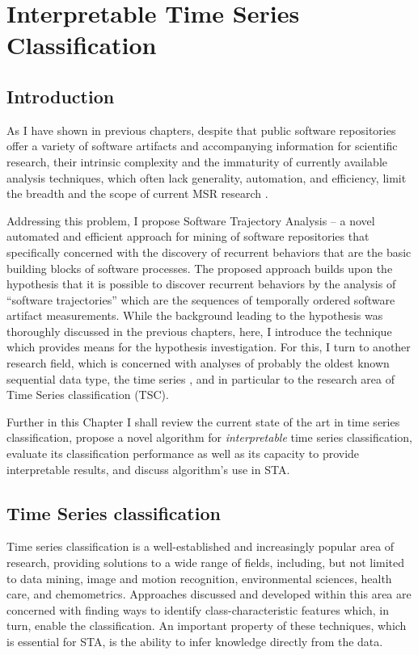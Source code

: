 \chapter{Interpretable Time Series Classification}\label{chapter_sax_vsm}

\section{Introduction}
As I have shown in previous chapters, despite that public software repositories offer a variety of software artifacts 
and accompanying information for scientific research, their intrinsic complexity and the immaturity of 
currently available analysis techniques, which often lack generality, automation, and efficiency, limit the breadth 
and the scope of current MSR research \cite{citeulike:7853299} \cite{citeulike:12550438}.

Addressing this problem, I propose Software Trajectory Analysis -- a novel automated and efficient approach for mining 
of software repositories that specifically concerned with the discovery of recurrent behaviors that are the basic building 
blocks of software processes. 
The proposed approach builds upon the hypothesis that it is possible to discover recurrent behaviors by the analysis 
of ``software trajectories'' which are the sequences of temporally ordered software artifact measurements. 
While the background leading to the hypothesis was thoroughly discussed in the previous chapters, here, 
I introduce the technique which provides means for the hypothesis investigation. 
For this, I turn to another research field, which is concerned with analyses of probably the oldest known sequential 
data type, the time series \cite{citeulike:1454223}, and in particular to the research area of 
Time Series classification (TSC).

Further in this Chapter I shall review the current state of the art in time series classification, propose a novel
algorithm for \textit{interpretable} time series classification, evaluate its classification performance as well as its  
capacity to provide interpretable results, and discuss algorithm's use in STA.

\section{Time Series classification}
Time series classification is a well-established and increasingly popular area of research, providing solutions to a wide 
range of fields, including, but not limited to data mining, image and motion recognition, environmental sciences, health care, 
and chemometrics. Approaches discussed and developed within this area are concerned with finding ways to identify 
class-characteristic features which, in turn, enable the classification. An important property of these techniques, 
which is essential for STA, is the ability to infer knowledge directly from the data.

